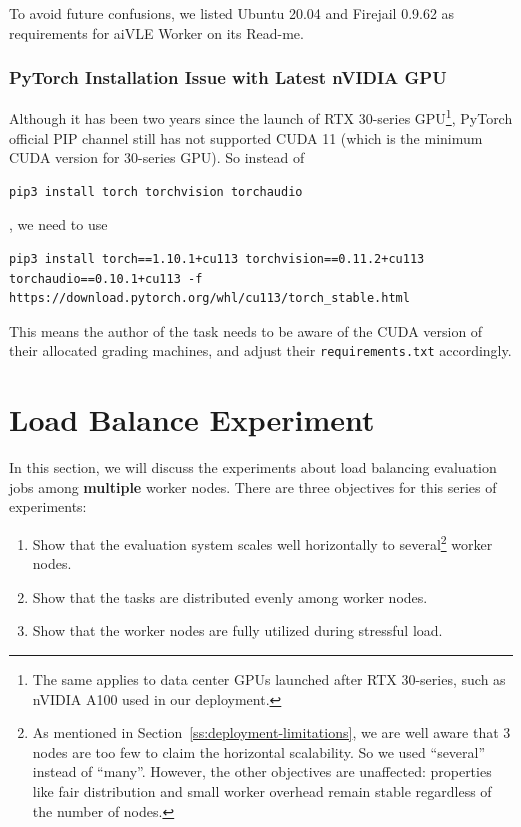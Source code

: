 To avoid future confusions, we listed Ubuntu 20.04 and Firejail 0.9.62 as requirements for aiVLE Worker on its Read-me.

\subsubsection{PyTorch Installation Issue with Latest nVIDIA GPU}
Although it has been two years since the launch of RTX 30-series GPU\footnote{The same applies to data center GPUs launched after RTX 30-series, such as nVIDIA A100 used in our deployment.}, PyTorch official PIP channel still has not supported CUDA 11 (which is the minimum CUDA version for 30-series GPU). So instead of 
\begin{code}
\begin{verbatim}
pip3 install torch torchvision torchaudio
\end{verbatim}
\end{code}
, we need to use
\begin{code}
\begin{verbatim}
pip3 install torch==1.10.1+cu113 torchvision==0.11.2+cu113 torchaudio==0.10.1+cu113 -f https://download.pytorch.org/whl/cu113/torch_stable.html
\end{verbatim}
\end{code}

This means the author of the task needs to be aware of the CUDA version of their allocated grading machines, and adjust their \texttt{requirements.txt} accordingly.

\section{Load Balance Experiment}
\label{s:load-balance-exp}
In this section, we will discuss the experiments about load balancing evaluation jobs among \textbf{multiple} worker nodes. There are three objectives for this series of experiments:

\begin{enumerate}
    \item Show that the evaluation system scales well horizontally to several\footnote{As mentioned in Section~\ref{ss:deployment-limitations}, we are well aware that 3 nodes are too few to claim the horizontal scalability. So we used ``several'' instead of ``many''. However, the other objectives are unaffected: properties like fair distribution and small worker overhead remain stable regardless of the number of nodes.} worker nodes.
    \item Show that the tasks are distributed evenly among worker nodes.
    \item Show that the worker nodes are fully utilized during stressful load.
\end{enumerate}

